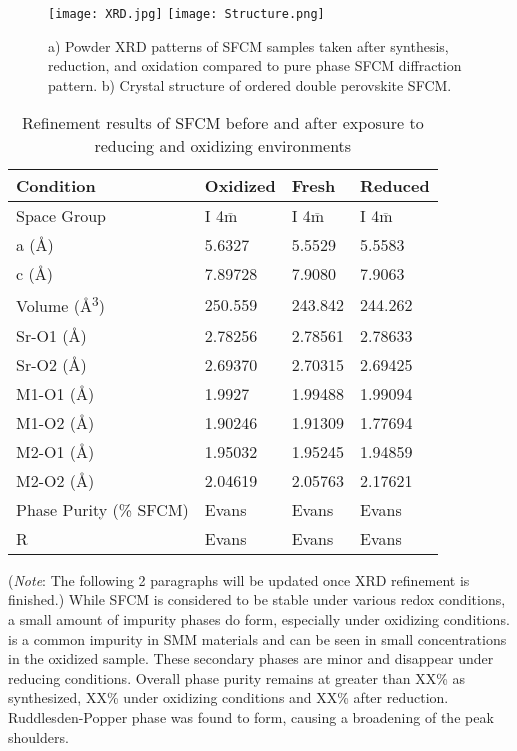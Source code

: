     \begin{figure}
      \texttt{[image: XRD.jpg]}
      \texttt{[image: Structure.png]}
      \caption{a) Powder XRD patterns of SFCM samples taken after synthesis, reduction, and oxidation compared to pure phase SFCM diffraction pattern. b) Crystal structure of ordered double perovskite SFCM. }
      \label{fig:structure}
    \end{figure}

    \begin{table}
        \centering
        \caption{Refinement results of SFCM before and after exposure to reducing and oxidizing environments}
        \label{tab:xrdrefine}
        \begin{tabular}{llll}
        Condition & Oxidized & Fresh   & Reduced  \\
        \hline
        Space Group                & I 4$\overline{\text{m}}$    & I 4$\overline{\text{m}}$   & I 4$\overline{\text{m}}$    \\
        a (\si{\angstrom})        & 5.6327   & 5.5529  & 5.5583   \\
        c (\si{\angstrom})        & 7.89728  & 7.9080 & 7.9063   \\
        Volume (\si{\angstrom\cubed})    & 250.559  & 243.842 & 244.262  \\
        Sr-O1 (\si{\angstrom})    & 2.78256  & 2.78561 & 2.78633  \\
        Sr-O2 (\si{\angstrom})    & 2.69370  & 2.70315 & 2.69425  \\
        M1-O1 (\si{\angstrom})    & 1.9927   & 1.99488 & 1.99094  \\
        M1-O2 (\si{\angstrom})    & 1.90246  & 1.91309 & 1.77694  \\
        M2-O1 (\si{\angstrom})    & 1.95032  & 1.95245 & 1.94859  \\
        M2-O2 (\si{\angstrom})    & 2.04619  & 2.05763 & 2.17621  \\
        Phase Purity (\% SFCM)    & Evans     & Evans    & Evans     \\
        R                         & Evans     & Evans    & Evans
        \end{tabular}
        \end{table}

    (\emph{Note}: The following 2 paragraphs will be updated once XRD refinement is finished.)
    While SFCM is considered to be stable under various redox conditions, a small amount of impurity phases do form, especially under oxidizing conditions. %
     is a common impurity in SMM materials and can be seen in small concentrations in the oxidized sample.
    These secondary phases are minor and disappear under reducing conditions.
    Overall phase purity remains at greater than XX\% as synthesized, XX\% under oxidizing conditions and XX\% after reduction.
    Ruddlesden-Popper phase was found to form, causing a broadening of the peak shoulders.

